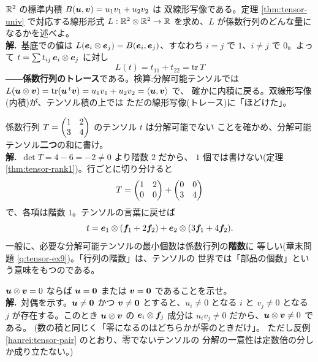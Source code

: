 \begin{rei}[例題・標準(内積はテンソル積の上ではトレース)]\label{rei:tensor-inner}
$\mathbb{R}^2$ の標準内積 $B(\bm{u}, \bm{v}) = u_1 v_1 + u_2 v_2$ は
双線形写像である。定理 \ref{thm:tensor-univ} で対応する線形形式
$L : \mathbb{R}^2 \otimes \mathbb{R}^2 \to \mathbb{R}$ を求め、$L$ が係数行列のどんな量に
なるかを述べよ。\\
\textbf{解.}\ 基底での値は
$L(\bm{e}_i \otimes \bm{e}_j) = B(\bm{e}_i, \bm{e}_j)$、すなわち
$i = j$ で $1$、$i \neq j$ で $0$。よって
$t = \sum t_{ij}\,\bm{e}_i \otimes \bm{e}_j$ に対し
\[
L(t) = t_{11} + t_{22} = \mathrm{tr}\,T
\]
――\textbf{係数行列のトレース}である。検算:分解可能テンソルでは
$L(\bm{u} \otimes \bm{v}) = \mathrm{tr}(\bm{u}\,{}^t\bm{v})
= u_1 v_1 + u_2 v_2 = \langle \bm{u}, \bm{v} \rangle$ で、
確かに内積に戻る。双線形写像(内積)が、テンソル積の上では
ただの線形写像(トレース)に「ほどけた」。
\end{rei}

\begin{rei}[例題・標準(階数 $2$ テンソルの分解)]\label{rei:tensor-rank2}
係数行列 $T = \begin{pmatrix}1 & 2 \\ 3 & 4\end{pmatrix}$ のテンソル $t$ は分解可能でない
ことを確かめ、分解可能テンソル\textbf{二つ}の和に書け。\\
\textbf{解.}\ $\det T = 4 - 6 = -2 \neq 0$ より階数 $2$ だから、
$1$ 個では書けない(定理 \ref{thm:tensor-rank1})。行ごとに切り分けると
\[
T = \begin{pmatrix}1 & 2 \\ 0 & 0\end{pmatrix} + \begin{pmatrix}0 & 0 \\ 3 & 4\end{pmatrix}
\]
で、各項は階数 $1$。テンソルの言葉に戻せば
\[
t = \bm{e}_1 \otimes (\bm{f}_1 + 2\bm{f}_2)
+ \bm{e}_2 \otimes (3\bm{f}_1 + 4\bm{f}_2).
\]
一般に、必要な分解可能テンソルの最小個数は係数行列の\textbf{階数}に
等しい(章末問題 \ref{q:tensor-ex9})。「行列の階数」は、テンソルの
世界では「部品の個数」という意味をもつのである。
\end{rei}

\begin{rei}\label{rei:tensor-zero}
$\bm{u} \otimes \bm{v} = 0$ ならば $\bm{u} = \bm{0}$ または
$\bm{v} = \bm{0}$ であることを示せ。\\
\textbf{解.}\ 対偶を示す。$\bm{u} \neq \bm{0}$ かつ
$\bm{v} \neq \bm{0}$ とすると、$u_i \neq 0$ となる $i$ と
$v_j \neq 0$ となる $j$ が存在する。このとき
$\bm{u} \otimes \bm{v}$ の $\bm{e}_i \otimes \bm{f}_j$ 成分は
$u_i v_j \neq 0$ だから、$\bm{u} \otimes \bm{v} \neq 0$ である。
(数の積と同じく「零になるのはどちらかが零のときだけ」。
ただし反例 \ref{hanrei:tensor-pair} のとおり、零でないテンソルの
分解の一意性は定数倍の分しか成り立たない。)
\end{rei}

